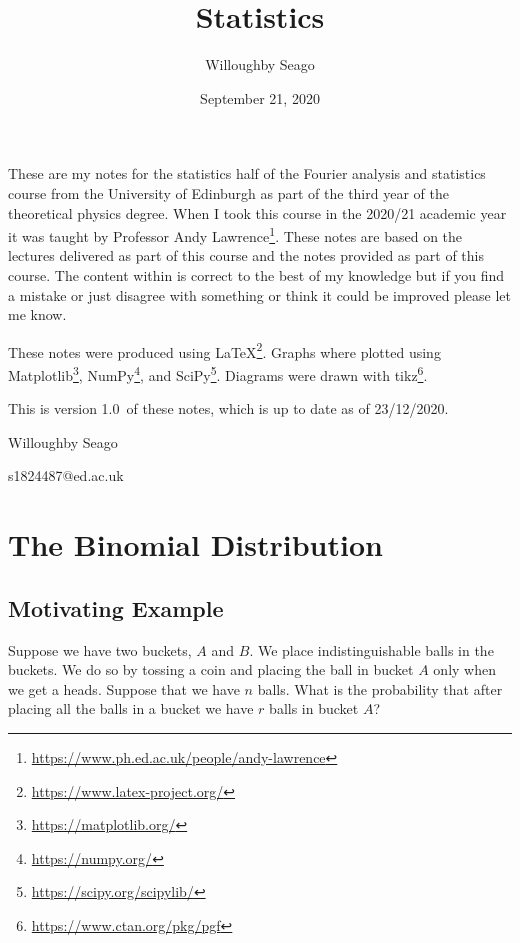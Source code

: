 \documentclass[a4paper]{article}
\author{Willoughby Seago}
\date{September 21, 2020}
\title{Statistics}
\newcommand{\notesVersion}{1.0}
\newcommand{\notesDate}{23/12/2020}
\begin{document}
    \maketitle
    These are my notes for the statistics half of the Fourier analysis and statistics course from the University of Edinburgh as part of the third year of the theoretical physics degree.
    When I took this course in the 2020/21 academic year it was taught by Professor Andy Lawrence\footnote{\url{https://www.ph.ed.ac.uk/people/andy-lawrence}}.
    These notes are based on the lectures delivered as part of this course and the notes provided as part of this course.
    The content within is correct to the best of my knowledge but if you find a mistake or just disagree with something or think it could be improved please let me know.
    
    These notes were produced using \LaTeX\footnote{\url{https://www.latex-project.org/}}.
    Graphs where plotted using Matplotlib\footnote{\url{https://matplotlib.org/}}, NumPy\footnote{\url{https://numpy.org/}}, and SciPy\footnote{\url{https://scipy.org/scipylib/}}.
    Diagrams were drawn with tikz\footnote{\url{https://www.ctan.org/pkg/pgf}}.
    
    This is version \notesVersion~of these notes, which is up to date as of \notesDate.
    \begin{flushright}
        Willoughby Seago
        
        s1824487@ed.ac.uk
    \end{flushright}
    \clearpage
    \tableofcontents
    \listoffigures
    \listoftables
    \printglossary[type=\acronymtype, title=Acronyms, style=long]
    \clearpage
    \begingroup
        \let\clearpage\relax  %
        
        
        
    \endgroup
    \section{The Binomial Distribution}
    \subsection{Motivating Example}
    Suppose we have two buckets, \(A\) and \(B\).
    We place indistinguishable balls in the buckets.
    We do so by tossing a coin and placing the ball in bucket \(A\) only when we get a heads.
    Suppose that we have \(n\) balls.
    What is the probability that after placing all the balls in a bucket we have \(r\) balls in bucket \(A\)?
    
\end{document}
